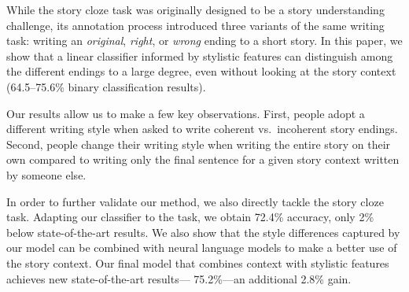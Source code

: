 \documentclass[11pt,a4paper]{article}
\newcommand{\com}[1]{}
\newcommand{\roy}[1]{{\color{orange}\textsc{[#1 --rs]}}}
\renewcommand{\roy}[1]{{\color{orange}[#1 --rs]}}
\renewcommand{\roy}[1]{#1}
\begin{document}
\com{We show that a linear classifier informed with stylistic features can distinguish among {\it original}, {\it right}, and {\it wrong}  endings to a large degree, even without looking at the story context.
Our results allow us to make a few key observations.
First, people adopt a different writing style when asked to write coherent vs.~incoherent story endings.
Second,  people change their writing style when writing the entire story on their own compared to 
writing only the final sentence for a given story context written by someone else.}



While the story cloze task was originally designed to be a story understanding challenge, 
its annotation process introduced three variants of the same writing task: writing an {\it original}, {\it right}, or {\it wrong} ending to a short story.
In this paper, we show that a linear classifier informed by stylistic features can distinguish among the different endings to a large degree, even without looking at the story context (64.5--75.6\% binary classification results).

Our results allow us to make a few key observations.
First, people adopt a different writing style when asked to write coherent vs.~incoherent story endings.
Second,  people change their writing style when writing the entire story on their own compared to 
writing only the final sentence for a given story context written by someone else.


In order to further validate our method, we also directly tackle the
story cloze task. 
Adapting our classifier to the task, we obtain 72.4\% accuracy, \com{a
 12.5\% increase over the previously reported state-of-the-art  \cite{Salle:2016}}\roy{only 2\% below state-of-the-art results}.
We also show that the style differences captured by our model can be combined with neural language models to make a better use of the story context. 
Our final model that combines context with stylistic features achieves \roy{new state-of-the-art results---}
75.2\%---an additional 2.8\% gain\com{, 15.3\% better than the best
published result}.

\com{Our results suggest that writing style is affected by the the writer's state of mind.
Writing a sentence intended to be {\it wrong} turns out quite differently than a sentence intended to be {\it right}. 
Similarly, writing a sentence as part of the story is different from reading a story, and then writing the final sentence.}
\end{document}
